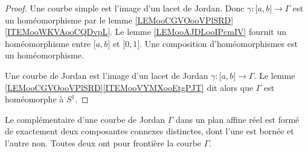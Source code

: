 \begin{proof}
    Une courbe simple est l'image d'un lacet de Jordan. Donc \( \gamma\colon \mathopen[ a , b \mathclose]\to \Gamma\) est un homéomorphisme par le lemme \ref{LEMooCGVOooVPlSRD}\ref{ITEMooWKVAooCQDvpL}. Le lemme \ref{LEMooAJDLooIPcmIV} fournit un homéomorphisme entre \( \mathopen[ a , b \mathclose]\) et \( \mathopen[ 0 , 1 \mathclose]\). Une composition d'homéomorphismes est un homéomorphisme.

    Une courbe de Jordan est l'image d'un lacet de Jordan \( \gamma\colon \mathopen[ a , b \mathclose]\to \Gamma\). Le lemme \ref{LEMooCGVOooVPlSRD}\ref{ITEMooVYMXooEtgPJT} dit alors que \( \Gamma\) est homéomorphe à \( S^1\).
\end{proof}


\begin{theorem}\label{ThoHSPWBuh}
	Le complémentaire d'une courbe de Jordan \( \Gamma\) dans un plan affine réel est formé de exactement deux composantes connexes distinctes, dont l'une est bornée et l'autre non. Toutes deux ont pour frontière la courbe \( \Gamma\).
\end{theorem}

